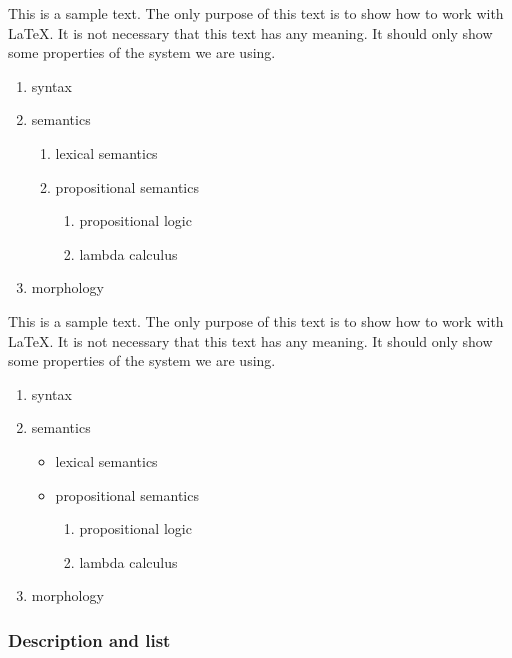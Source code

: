 \documentclass[10pt, paper=a4, abstracton]{scrartcl}
\begin{document}
This is a sample text. The only purpose of this text is to show how to work with \LaTeX . It is not necessary that this text has any meaning. It should only show some properties of the system we are using.

\begin{enumerate}
	\item syntax
	\item semantics 
	
	\begin{enumerate}
		\item lexical semantics
		\item propositional semantics
		
		\begin{enumerate}
			\item propositional logic
			\item lambda calculus
		\end{enumerate}
	\end{enumerate}
	
	\item morphology
\end{enumerate}


This is a sample text. The only purpose of this text is to show how to work with \LaTeX . It is not necessary that this text has any meaning. It should only show some properties of the system we are using.

\begin{enumerate}
	\item syntax
	\item semantics 
	
	\begin{itemize}
		\item lexical semantics
		\item propositional semantics
		
		\begin{enumerate}
			\item propositional logic
			\item lambda calculus
		\end{enumerate}
	\end{itemize}
	
	\item morphology
\end{enumerate}


\subsubsection{Description and list}
\end{document}
